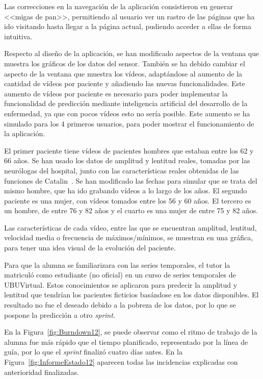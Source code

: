 Las correcciones en la navegación de la aplicación consistieron en generar <<migas de pan>>, permitiendo al usuario ver un rastro de las páginas que ha ido visitando hasta llegar a la página actual, pudiendo acceder a ellas de forma intuitiva.

Respecto al diseño de la aplicación, se han modificado aspectos de la ventana que muestra los gráficos de los datos del sensor. También se ha debido cambiar el aspecto de la ventana que muestra los vídeos, adaptándose al aumento de la cantidad de vídeos por paciente y añadiendo las nuevas funcionalidades.
Este aumento de vídeos por paciente es necesario para poder implementar la funcionalidad de predicción mediante inteligencia artificial del desarrollo de la enfermedad, ya que con pocos vídeos esto no sería posible. Este aumento se ha simulado para los 4 primeros usuarios, para poder mostrar el funcionamiento de la aplicación.

El primer paciente tiene vídeos de pacientes hombres que estaban entre los 62 y 66 años. Se han usado los datos de amplitud y lentitud reales, tomadas por las neurólogas del hospital, junto con las características reales obtenidas de las funciones de Catalin~\cite{TFGCatalin}. Se han modificado las fechas para simular que se trata del mismo hombre, que ha ido grabando vídeos a lo largo de los años.
El segundo paciente es una mujer, con vídeos tomados entre los 56 y 60 años. El tercero es un hombre, de entre 76 y 82 años y el cuarto es una mujer de entre 75 y 82 años.

Las características de cada vídeo, entre las que se encuentran amplitud, lentitud, velocidad media o frecuencia de máximos/mínimos, se muestran en una gráfica, para tener una idea visual de la evolución del paciente.

Para que la alumna se familiarizara con las series temporales, el tutor la matriculó como estudiante (no oficial) en un curso de series temporales de UBUVirtual. Estos conocimientos se aplicaron para predecir la amplitud y lentitud que tendrían los pacientes ficticios basándose en los datos disponibles. El resultado no fue el deseado debido a la pobreza de los datos, por lo que se pospone la predicción a otro \textit{sprint}.


En la Figura~\ref{fig:Burndown12}, se puede observar como el ritmo de trabajo de la alumna fue más rápido que el tiempo planificado, representado por la línea de guía, por lo que el \textit{sprint} finalizó cuatro días antes.
En la Figura~\ref{fig:InformeEstado12} aparecen todas las incidencias explicadas con anterioridad finalizadas.




